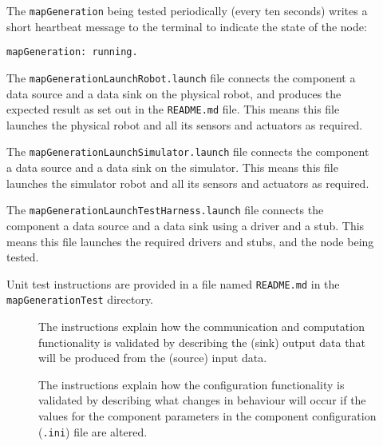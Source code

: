 \documentclass{CSSRforAfrica}
\newcommand{\checkboxChecked}{\fbox{\ding{51}}} %
\newcommand{\checkboxDashed}{\fbox{--}}         %
\begin{document}
\begin{description}
\item[\checkboxChecked]  The {\small \verb+mapGeneration+} being tested periodically (every ten seconds) writes a short heartbeat message to
 the terminal to indicate the state of the node:
\begin{verbatim}
mapGeneration: running.
\end{verbatim}

\item[\checkboxDashed] The {\small \verb+mapGenerationLaunchRobot.launch+} file  connects the component a data source and a data sink on the physical robot, and produces the expected result as set out in the  {\small \verb+README.md+}  file.    This means this file launches the physical robot and all its sensors and actuators as required.

\item[\checkboxDashed] The {\small \verb+mapGenerationLaunchSimulator.launch+} file  connects the component a data source and a data sink on the simulator.   This means this file launches the simulator robot and all its sensors and actuators as required.

\item[\checkboxDashed] The {\small \verb+mapGenerationLaunchTestHarness.launch+} file  connects the component a data source and a data sink using a driver and a stub.   This means this file launches the required drivers and stubs, and the node being tested.

\item[\checkboxChecked] Unit test instructions are provided in a file named {\small \verb+README.md+} in the  {\small \verb+mapGenerationTest+} directory. 


\begin{description}

\item[\checkboxChecked] The instructions explain how the communication and computation functionality is validated by describing the (sink) output data that will be produced from the (source) input data.  

\item[\checkboxChecked] The instructions explain how the configuration functionality is validated by describing what changes in behaviour will occur if the values for the component parameters in the component configuration ({\small \verb+.ini+}) file are altered.

\end{description}

\end{description} 
  
\end{document}
